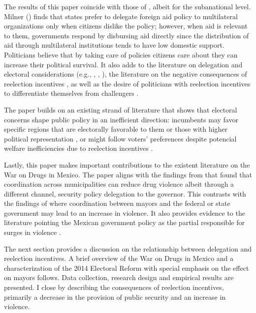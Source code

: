 \documentclass[12pt]{amsart}
\numberwithin{equation}{section}
\theoremstyle{definition}
\theoremstyle{definition}
\theoremstyle{definition}
\begin{document}
   
The results of this paper coincide with those of \citet{milner_2004}, albeit for the subanational level. Milner (\citeyear{milner_2004}) finds that states prefer to delegate foreign aid policy to multilateral organizations only when citizens dislike the policy; however, when aid is relevant to them, governments respond by disbursing aid directly since the distribution of aid through multilateral institutions tends to have low domestic support. Politicians believe that by taking care of policies citizens care about they can increase their political survival. It also adds to the literature on delegation and electoral considerations (e.g., \citet{mccubbins_1991}, \citet{fiorina_1982}, \citet{loftis_2014}), the literature on the negative consequences of reelection incentives \citep{coviello_etal_2017}, as well as the desire of politicians with reelection incentives to differentiate themselves from challengers \citep{motolinia_2020}.             

The paper builds on an existing strand of literature that shows that electoral concerns shape public policy in an inefficient direction: incumbents may favor specific regions that are electorally favorable to them \citep{schady_2000, Miguel_zaidi_2003, cole_2004, khemani_2007} or those with higher political representation  \citep{wright_1974, porto_2001, ansolabehere_etal_2002}, or might follow voters’ preferences despite potencial welfare inefficiencies due to reelection incentives \citep{pulejo_querubin_2021}.  

Lastly, this paper makes important contributions to the existent literature on the War on Drugs in Mexico. The paper aligns with the findings from \citet{durante_gutierrez_2013} that found that coordination across municipalities can reduce drug violence albeit through a different channel, security policy delegation to the governor. This contrasts with the findings of \citet{dell_2015} where coordination between mayors and the federal or state government may lead to an increase in violence. It also provides evidence to the literature pointing the Mexican government policy as the partial responsible for surges in violence \citep{escalante_2011, guerrero_2011}.  

The next section provides a  discussion on the relationship between delegation and reelection incentives. A brief overview of the War on Drugs in Mexico and a characterization of the 2014 Electoral Reform with special emphasis on the effect on mayors follows. Data collection, research design and empirical results are presented. I close by describing the consequences of reelection incentives, primarily a decrease in the provision of public security and an increase in violence.
      
\end{document}
